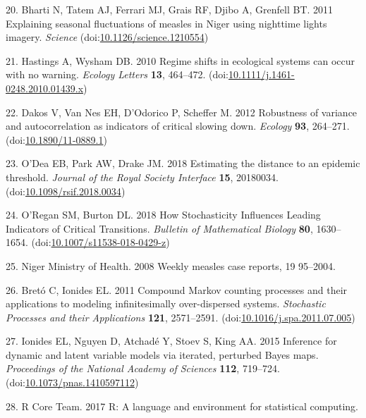 \documentclass[3p]{elsarticle} %
\begin{document}
\leavevmode\hypertarget{ref-Bharti2011}{}%
20. Bharti N, Tatem AJ, Ferrari MJ, Grais RF, Djibo A, Grenfell BT. 2011
Explaining seasonal fluctuations of measles in Niger using nighttime
lights imagery. \emph{Science}
(doi:\href{https://doi.org/10.1126/science.1210554}{10.1126/science.1210554})

\leavevmode\hypertarget{ref-Hastings2010}{}%
21. Hastings A, Wysham DB. 2010 Regime shifts in ecological systems can
occur with no warning. \emph{Ecology Letters} \textbf{13}, 464--472.
(doi:\href{https://doi.org/10.1111/j.1461-0248.2010.01439.x}{10.1111/j.1461-0248.2010.01439.x})

\leavevmode\hypertarget{ref-Dakos2012a}{}%
22. Dakos V, Van Nes EH, D'Odorico P, Scheffer M. 2012 Robustness of
variance and autocorrelation as indicators of critical slowing down.
\emph{Ecology} \textbf{93}, 264--271.
(doi:\href{https://doi.org/10.1890/11-0889.1}{10.1890/11-0889.1})

\leavevmode\hypertarget{ref-ODea2018a}{}%
23. O'Dea EB, Park AW, Drake JM. 2018 Estimating the distance to an
epidemic threshold. \emph{Journal of the Royal Society Interface}
\textbf{15}, 20180034.
(doi:\href{https://doi.org/10.1098/rsif.2018.0034}{10.1098/rsif.2018.0034})

\leavevmode\hypertarget{ref-ORegan2018}{}%
24. O'Regan SM, Burton DL. 2018 How Stochasticity Influences Leading
Indicators of Critical Transitions. \emph{Bulletin of Mathematical
Biology} \textbf{80}, 1630--1654.
(doi:\href{https://doi.org/10.1007/s11538-018-0429-z}{10.1007/s11538-018-0429-z})

\leavevmode\hypertarget{ref-NigerMinistryofHealth2008}{}%
25. Niger Ministry of Health. 2008 Weekly measles case reports, 19
95--2004.

\leavevmode\hypertarget{ref-Breto2011}{}%
26. Bretó C, Ionides EL. 2011 Compound Markov counting processes and
their applications to modeling infinitesimally over-dispersed systems.
\emph{Stochastic Processes and their Applications} \textbf{121},
2571--2591.
(doi:\href{https://doi.org/10.1016/j.spa.2011.07.005}{10.1016/j.spa.2011.07.005})

\leavevmode\hypertarget{ref-Ionides2015}{}%
27. Ionides EL, Nguyen D, Atchadé Y, Stoev S, King AA. 2015 Inference
for dynamic and latent variable models via iterated, perturbed Bayes
maps. \emph{Proceedings of the National Academy of Sciences}
\textbf{112}, 719--724.
(doi:\href{https://doi.org/10.1073/pnas.1410597112}{10.1073/pnas.1410597112})

\leavevmode\hypertarget{ref-R2017}{}%
28. R Core Team. 2017 R: A language and environment for statistical
computing.
\end{document}
